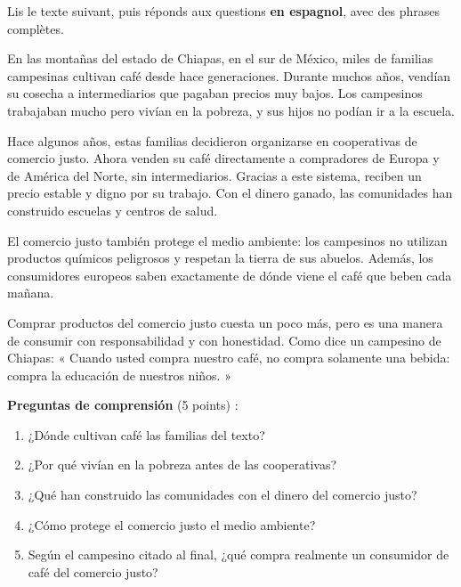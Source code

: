 \documentclass[11pt]{article}
\begin{document}
\begin{exercice}
Lis le texte suivant, puis réponds aux questions \textbf{en espagnol}, avec des phrases complètes.

\begin{textebox}
En las montañas del estado de Chiapas, en el sur de México, miles de familias campesinas cultivan café desde hace generaciones. Durante muchos años, vendían su cosecha a intermediarios que pagaban precios muy bajos. Los campesinos trabajaban mucho pero vivían en la pobreza, y sus hijos no podían ir a la escuela.

Hace algunos años, estas familias decidieron organizarse en cooperativas de comercio justo. Ahora venden su café directamente a compradores de Europa y de América del Norte, sin intermediarios. Gracias a este sistema, reciben un precio estable y digno por su trabajo. Con el dinero ganado, las comunidades han construido escuelas y centros de salud.

El comercio justo también protege el medio ambiente: los campesinos no utilizan productos químicos peligrosos y respetan la tierra de sus abuelos. Además, los consumidores europeos saben exactamente de dónde viene el café que beben cada mañana.

Comprar productos del comercio justo cuesta un poco más, pero es una manera de consumir con responsabilidad y con honestidad. Como dice un campesino de Chiapas: « Cuando usted compra nuestro café, no compra solamente una bebida: compra la educación de nuestros niños. »
\end{textebox}

\textbf{Preguntas de comprensión} (5 points) :
\begin{enumerate}
\item ¿Dónde cultivan café las familias del texto?
\item ¿Por qué vivían en la pobreza antes de las cooperativas?
\item ¿Qué han construido las comunidades con el dinero del comercio justo?
\item ¿Cómo protege el comercio justo el medio ambiente?
\item Según el campesino citado al final, ¿qué compra realmente un consumidor de café del comercio justo?
\end{enumerate}


\end{exercice}
\end{document}
